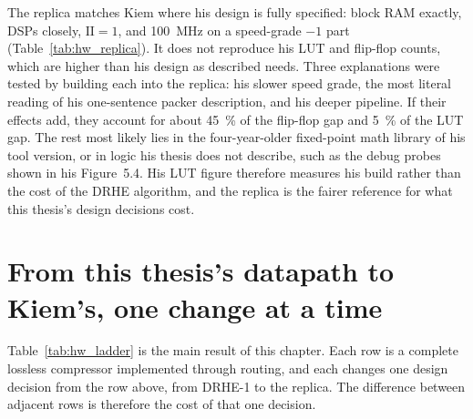 The replica matches Kiem where his design is fully specified: block RAM
exactly, DSPs closely, $\mathrm{II} = 1$, and \SI{100}{\mega\hertz} on a
speed-grade $-1$ part (Table~\ref{tab:hw_replica}). It does not reproduce his
LUT and flip-flop counts, which are higher than his design as described needs.
Three explanations were tested by building each into the replica: his slower
speed grade, the most literal reading of his one-sentence packer description,
and his deeper pipeline. If their effects add, they account for about
\SI{45}{\percent} of the flip-flop gap and \SI{5}{\percent} of the LUT gap. The
rest most likely lies in the four-year-older fixed-point math library of his
tool version, or in logic his thesis does not describe, such as the debug
probes shown in his Figure~5.4. His LUT figure therefore measures his build
rather than the cost of the DRHE algorithm, and the replica is the fairer
reference for what this thesis's design decisions cost.

\section{From this thesis's datapath to Kiem's, one change at a time}
\label{sec:hw_ladder}

Table~\ref{tab:hw_ladder} is the main result of this chapter. Each row is a
complete lossless compressor implemented through routing, and each changes one
design decision from the row above, from DRHE-1 to the replica. The difference
between adjacent rows is therefore the cost of that one decision.

